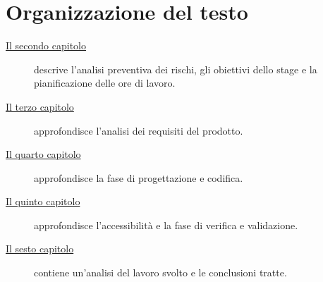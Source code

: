\section{Organizzazione del testo}

\begin{description}    
    \item[{\hyperref[cap:descrizione-stage]{Il secondo capitolo}}] descrive l'analisi preventiva dei rischi, gli obiettivi dello stage e
    la pianificazione delle ore di lavoro.
    \item[{\hyperref[cap:analisi-requisiti]{Il terzo capitolo}}] approfondisce l'analisi dei requisiti del prodotto.
    
    \item[{\hyperref[cap:progettazione-codifica]{Il quarto capitolo}}] approfondisce la fase di progettazione e codifica.
    
    \item[{\hyperref[cap:verifica-validazione]{Il quinto capitolo}}] approfondisce l'accessibilità e la fase di verifica e validazione.
    
    \item[{\hyperref[cap:conclusioni]{Il sesto capitolo}}] contiene un’analisi del lavoro svolto e le conclusioni tratte.
\end{description}
